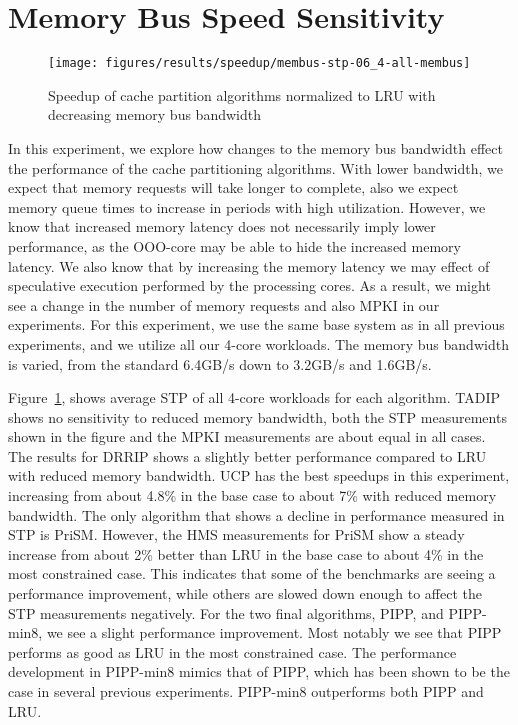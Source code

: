 \section{Memory Bus Speed Sensitivity}
\label{sec:results:bus_sensitivity}


\begin{figure}[t]
    \centering
    \texttt{[image: figures/results/speedup/membus-stp-06\_4-all-membus]}
    \caption{Speedup of cache partition algorithms normalized to LRU with decreasing memory bus bandwidth}
    \label{fig:results:bus}
\end{figure}

In this experiment, we explore how changes to the memory bus bandwidth effect the performance of the cache partitioning algorithms.
With lower bandwidth, we expect that memory requests will take longer to complete, also we expect memory queue times to increase in periods with high utilization.
However, we know that increased memory latency does not necessarily imply lower performance, as the OOO-core may be able to hide the increased memory latency.
We also know that by increasing the memory latency we may effect of speculative execution performed by the processing cores.
As a result, we might see a change in the number of memory requests and also MPKI in our experiments.
For this experiment, we use the same base system as in all previous experiments, and we utilize all our 4-core workloads.
The memory bus bandwidth is varied, from the standard 6.4GB/s down to 3.2GB/s and 1.6GB/s.

Figure~\ref{fig:results:bus}, shows average STP of all 4-core workloads for each algorithm.
TADIP shows no sensitivity to reduced memory bandwidth, both the STP measurements shown in the figure and the MPKI measurements are about equal in all cases.
The results for DRRIP shows a slightly better performance compared to LRU with reduced memory bandwidth.
UCP has the best speedups in this experiment, increasing from about 4.8\% in the base case to about 7\% with reduced memory bandwidth.
The only algorithm that shows a decline in performance measured in STP is PriSM.
However, the HMS measurements for PriSM show a steady increase from about 2\% better than LRU in the base case to about 4\% in the most constrained case.
This indicates that some of the benchmarks are seeing a performance improvement, while others are slowed down enough to affect the STP measurements negatively.
For the two final algorithms, PIPP, and PIPP-min8, we see a slight performance improvement.
Most notably we see that PIPP performs as good as LRU in the most constrained case.
The performance development in PIPP-min8 mimics that of PIPP, which has been shown to be the case in several previous experiments.
PIPP-min8 outperforms both PIPP and LRU.

